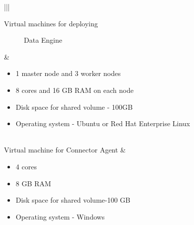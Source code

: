 \documentclass[letterpaper,10pt,english]{sphinxmanual}
\begin{document}
\begin{savenotes}\sphinxattablestart
\centering
\begin{tabular}[t]{|*{2}{|}}
\hline
\begin{description}
\item[{Virtual machines for deploying}] \leavevmode
Data Engine

\end{description}
&\begin{itemize}
\item {} 
1 master node and 3 worker nodes

\item {} 
8 cores and 16 GB RAM on each node

\item {} 
Disk space for shared volume -
100GB

\item {} 
Operating system - Ubuntu or Red Hat
Enterprise Linux

\end{itemize}
\\
\hline
Virtual machine for Connector Agent
&\begin{itemize}
\item {} 
4 cores

\item {} 
8 GB RAM

\item {} 
Disk space for shared volume-100 GB

\item {} 
Operating system - Windows

\end{itemize}
\\
\hline
\end{tabular}
\par
\sphinxattableend\end{savenotes}
\end{document}
